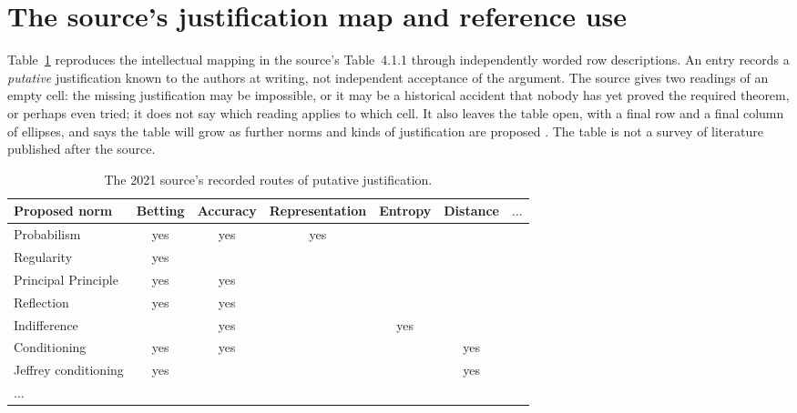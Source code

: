 \section{The source's justification map and reference use}
\label{sec:p15-rat41-reference-use}

Table~\ref{tab:p15-rat41-justifications} reproduces the intellectual
mapping in the source's Table~4.1.1 through independently worded row
descriptions. An entry records a \emph{putative} justification known
to the authors at writing, not independent acceptance of the argument.
The source gives two readings of an empty cell: the missing
justification may be impossible, or it may be a historical accident that
nobody has yet proved the required theorem, or perhaps even tried; it does
not say which reading applies to which cell. It also leaves the table open,
with a final row and a final column of ellipses, and says the table will
grow as further norms and kinds of justification are proposed
\parencite[pp.~247--248]{HajekStaffel2021Dynamics}. The table is not a survey
of literature published after the source.

\begin{table}[htbp]
\centering\small
\begin{tabular}{lcccccc}
\hline
Proposed norm & Betting & Accuracy & Representation & Entropy & Distance & \(\ldots\)\\
\hline
Probabilism & yes & yes & yes & & & \\
Regularity & yes & & & & & \\
Principal Principle & yes & yes & & & & \\
Reflection & yes & yes & & & & \\
Indifference & & yes & & yes & & \\
Conditioning & yes & yes & & & yes & \\
Jeffrey conditioning & yes & & & & yes & \\
\(\ldots\) & & & & & & \\
\hline
\end{tabular}
\caption{The 2021 source's recorded routes of putative justification.}
\label{tab:p15-rat41-justifications}
\end{table}

